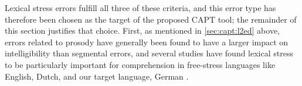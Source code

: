 	Lexical stress errors fulfill all three of these criteria, and this error type has therefore been chosen as the target of the proposed CAPT tool; the remainder of this section justifies that choice. 
%	
%	
%
%	 
%
%	
%
%
	First, as mentioned in \cref{sec:capt:l2ed} above, errors related to prosody have generally been found to have a larger impact on intelligibility than segmental errors, and several studies have found lexical stress to be particularly important for comprehension in free-stress languages like English, Dutch, and our target language, German \citep{Hirschfeld1994,Cutler2005}.
%
